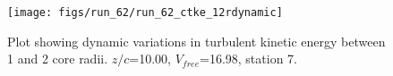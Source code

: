 \begin{figure}[H]
\centering
\texttt{[image: figs/run\_62/run\_62\_ctke\_12rdynamic]}
\caption{Plot showing dynamic variations in turbulent kinetic energy between 1 and 2 core radii. $z/c$=10.00, $V_{free}$=16.98, station 7.}
\end{figure}


